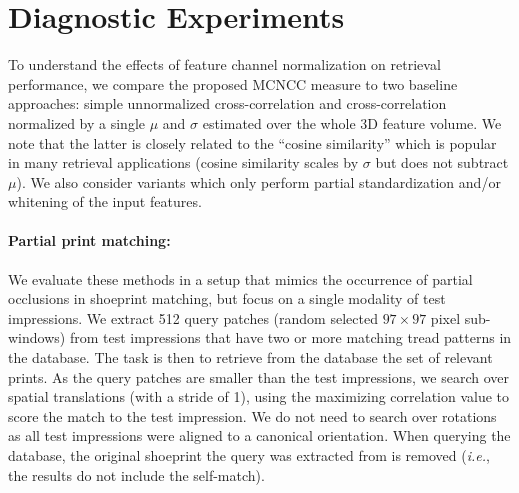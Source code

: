 \documentclass[twocolumn]{svjour3}           %
\newcommand{\ie}{\emph{i.e.}}
\begin{document}
\section{Diagnostic Experiments}
\label{sec:diag_experiments}
To understand the effects of feature channel normalization on retrieval
performance, we compare the proposed MCNCC measure to two baseline approaches:
simple unnormalized cross-correlation and cross-correlation normalized by a
single $\mu$ and $\sigma$ estimated over the whole 3D feature volume. We note
that the latter is closely related to the ``cosine similarity'' which is
popular in many retrieval applications (cosine similarity scales by $\sigma$
but does not subtract $\mu$). We also consider variants which only perform
partial standardization and/or whitening of the input features.

\paragraph{Partial print matching:}
We evaluate these methods in a setup that mimics the occurrence of partial
occlusions in shoeprint matching, but focus on a single modality of test
impressions.  We extract 512 query patches (random selected $97\times97$ pixel
sub-windows) from test impressions that have two or more matching tread
patterns in the database.  The task is then to retrieve from the database the
set of relevant prints.  As the query patches are smaller than the test
impressions, we search over spatial translations (with a stride of 1), using
the maximizing correlation value to score the match to the test impression. We
do not need to search over rotations as all test impressions were aligned to a
canonical orientation.  When querying the database, the original shoeprint the
query was extracted from is removed (\ie, the results do not include the
self-match).
\end{document}
